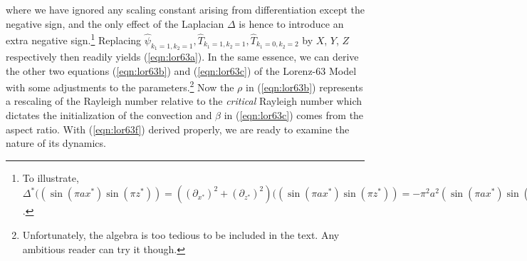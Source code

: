 where we have ignored any scaling constant arising from differentiation except the negative sign, and the only effect of the Laplacian $\Delta$ is hence to introduce an extra negative sign.\footnote{To illustrate, $\Delta^*((\sin(\pi a x^*)\sin(\pi z^*)) = ((\partial_{x^*})^2 + (\partial_{z^*})^2)((\sin(\pi a x^*)\sin(\pi z^*)) = -\pi^2a^2 (\sin(\pi a x^*)\sin(\pi z^*)) - (\sin(\pi a x^*)\sin(\pi z^*)) = -(\pi^2a^2 + \pi^2)(\sin(\pi a x^*)\sin(\pi z^*))$.} Replacing $\hat{\psi}_{k_1 = 1, k_2 = 1}, \hat{T}_{k_1 = 1, k_2 = 1}, \hat{T}_{k_1 = 0, k_2 = 2}$ by $X$, $Y$, $Z$ respectively then readily yields (\ref{eqn:lor63a}). In the same essence, we can derive the other two equations (\ref{eqn:lor63b}) and (\ref{eqn:lor63c}) of the Lorenz-63 Model with some adjustments to the parameters.\footnote{Unfortunately, the algebra is too tedious to be included in the text. Any ambitious reader can try it though.} Now the $\rho$ in (\ref{eqn:lor63b}) represents a rescaling of the Rayleigh number relative to the \textit{critical} Rayleigh number which dictates the initialization of the convection and $\beta$ in (\ref{eqn:lor63c}) comes from the aspect ratio. With (\ref{eqn:lor63f}) derived properly, we are ready to examine the nature of its dynamics.

